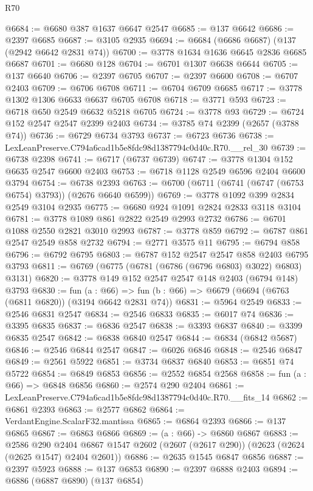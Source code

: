 \begin{lexlean}{R70}
\begin{coremodule}
@6684 := @6680 @387 @1637 @6647 @2547
@6685 := @137 @6642
@6686 := @2397 @6685
@6687 := @3105 @2935
@6694 := @6684 (@6686 @6687) (@137 (@2942 @6642 @2831 @74))
@6700 := @3778 @1634 @1636 @6645 @2836 @6685 @6687
@6701 := @6680 @128
@6704 := @6701 @1307 @6638 @6644
@6705 := @137 @6640
@6706 := @2397 @6705
@6707 := @2397 @6600
@6708 := @6707 @2403
@6709 := @6706 @6708
@6711 := @6704 @6709 @6685
@6717 := @3778 @1302 @1306 @6633 @6637 @6705 @6708
@6718 := @3771 @593
@6723 := @6718 @650 @2549 @6632 @5218 @6705
@6724 := @3778 @93
@6729 := @6724 @152 @2547 @2547 @2399 @2403
@6734 := @3785 @74 @2399 (@2657 (@3788 @74))
@6736 := @6729 @6734 @3793
@6737 := @6723 @6736
@6738 := LexLeanPreserve.C794a6cad1b5e8fdc98d1387794c0d40c.R70.__rel_30
@6739 := @6738 @2398
@6741 := @6717 (@6737 @6739)
@6747 := @3778 @1304 @152 @6635 @2547 @6600 @2403
@6753 := @6718 @1128 @2549 @6596 @2404 @6600 @3794
@6754 := @6738 @2393
@6763 := @6700 (@6711 (@6741 (@6747 (@6753 @6754) @3793)) (@2676 @6640 @6599))
@6769 := @3778 @1092 @399 @2834 @2549 @3104 @2935
@6775 := @6680 @924 @1091 @2824 @2833 @3118 @3104
@6781 := @3778 @1089 @861 @2822 @2549 @2993 @2732
@6786 := @6701 @1088 @2550 @2821 @3010 @2993
@6787 := @3778 @859
@6792 := @6787 @861 @2547 @2549 @858 @2732
@6794 := @2771 @3575 @11
@6795 := @6794 @858
@6796 := @6792 @6795
@6803 := @6787 @152 @2547 @2547 @858 @2403 @6795 @3793
@6811 := @6769 (@6775 (@6781 (@6786 (@6796 @6803) @3022) @6803) @3131)
@6820 := @3778 @149 @152 @2547 @2547 @148 @2403 (@6794 @148) @3793
@6830 := fun (a : @66) =>
  fun (b : @66) => @6679 (@6694 (@6763 (@6811 @6820)) (@3194 @6642 @2831 @74))
@6831 := @5964 @2549
@6833 := @2546 @6831 @2547
@6834 := @2546 @6833
@6835 := @6017 @74
@6836 := @3395 @6835
@6837 := @6836 @2547
@6838 := @3393 @6837
@6840 := @3399 @6835 @2547
@6842 := @6838 @6840 @2547
@6844 := @6834 (@6842 @5687)
@6846 := @2546 @6844 @2547
@6847 := @6026 @6846
@6848 := @2546 @6847
@6849 := @2561 @5922
@6851 := @3734 @6837 @6840
@6853 := @6851 @74 @5722
@6854 := @6849 @6853
@6856 := @2552 @6854 @2568
@6858 := fun (a : @66) => @6848 @6856
@6860 := @2574 @290 @2404
@6861 := LexLeanPreserve.C794a6cad1b5e8fdc98d1387794c0d40c.R70.__fits_14
@6862 := @6861 @2393
@6863 := @2577 @6862
@6864 := VerdantEngine.ScalarF32.mantissa
@6865 := @6864 @2393
@6866 := @137 @6865
@6867 := @6863 @6866
@6869 := (a : @66) -> @6860 @6867
@6883 := @2586
    @290
    @2404
    @6867
    @1547
    @2602
    (@2607 (@2617 @290))
    (@2623 (@2624 (@2625 @1547) @2404 @2601))
@6886 := @2635 @1545 @6847 @6856
@6887 := @2397 @5923
@6888 := @137 @6853
@6890 := @2397 @6888 @2403
@6894 := @6886 (@6887 @6890) (@137 @6854)

\end{coremodule}
\end{lexlean}
